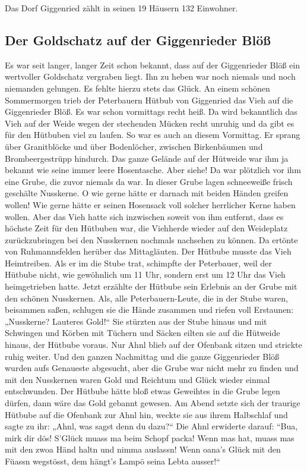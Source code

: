 \documentclass[12pt,a4pager]{book}
\begin{document}
Das Dorf Giggenried zählt in seinen 19 Häusern 132 Einwohner.

\subsection{Der Goldschatz auf der Giggenrieder Blöß}

Es war seit langer, langer Zeit schon bekannt, dass auf der Giggenrieder Blöß
ein wertvoller Goldschatz vergraben liegt. Ihn zu heben war noch niemals und
noch niemanden gelungen. Es fehlte hierzu stets das Glück. An einem schönen
Sommermorgen trieb der Peterbauern Hütbub von Giggenried das Vieh auf die
Giggenrieder Blöß. Es war schon vormittags recht heiß. Da wird bekanntlich das
Vieh auf der Weide wegen der stechenden Mücken recht unruhig und da gibt es für
den Hütbuben viel zu laufen. So war es auch an diesem Vormittag. Er sprang über
Granitblöcke und über Bodenlöcher, zwischen Birkenbäumen und Brombeergestrüpp
hindurch. Das ganze Gelände auf der Hütweide war ihm ja bekannt wie seine immer
leere Hosentasche. Aber siehe! Da war plötzlich vor ihm eine Grube, die zuvor
niemals da war. In dieser Grube lagen schneeweiße frisch geschälte Nusskerne. O
wie gerne hätte er darnach mit beiden Händen greifen wollen! Wie gerne hätte er
seinen Hosensack voll solcher herrlicher Kerne haben wollen. Aber das Vieh hatte
sich inzwischen soweit von ihm entfernt, dass es höchste Zeit für den Hütbuben
war, die Viehherde wieder auf den Weideplatz zurückzubringen bei den Nusskernen
nochmals nachsehen zu können. Da ertönte von Ruhmannsfelden herüber das
Mittagläuten. Der Hütbube musste das Vieh Heimtreiben. Als er im die Stube trat,
schimpfte der Peterbauer, weil der Hütbube nicht, wie gewöhnlich um 11 Uhr,
sondern erst um 12 Uhr das Vieh heimgetrieben hatte. Jetzt erzählte der Hütbube
sein Erlebnis an der Grube mit den schönen Nusskernen. Als, alle
Peterbauern-Leute, die in der Stube waren, beisammen saßen, schlugen sie die
Hände zusammen und riefen voll Erstaunen: „Nusskerne? Lauteres Gold!“ Sie
stürzten aus der Stube hinaus und mit Schwingen und Körben mit Tüchern und
Säcken eilten sie auf die Hütweide hinaus, der Hütbube voraus. Nur Ahnl blieb
auf der Ofenbank sitzen und strickte ruhig weiter. Und den ganzen Nachmittag und
die ganze Giggenrieder Blöß wurden aufs Genaueste abgesucht, aber die Grube war
nicht mehr zu finden und mit den Nusskernen waren Gold und Reichtum und Glück
wieder einmal entschwunden. Der Hütbube hätte bloß etwas Geweihtes in die Grube
legen dürfen, dann wäre das Gold gebannt gewesen. Am Abend setzte sich der
traurige Hütbube auf die Ofenbank zur Ahnl hin, weckte sie aus ihrem Halbschlaf
und sagte zu ihr: „Ahnl, was sagst denn du dazu?“ Die Ahnl erwiderte darauf:
“Bua, mirk dir dös! S'Glück muass ma beim Schopf packa! Wenn mas hat, muass mas
mit den zwoa Händ haltn und nimma auslassn! Wenn oana's Glück mit den Füassn
wegstösst, dem hängt's Lampö seina Lebta ausser!“
\end{document}
